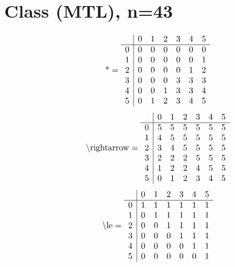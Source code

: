\documentclass[11pt]{article}
\begin{document}
\section{Class (MTL), n=43}
\[\text{*} = 
\begin{array}{r | r r r r r r}
 & 0 & 1 & 2 & 3 & 4 & 5 \\ \hline
0 & 0 & 0 & 0 & 0 & 0 & 0 \\
1 & 0 & 0 & 0 & 0 & 0 & 1 \\
2 & 0 & 0 & 0 & 0 & 1 & 2 \\
3 & 0 & 0 & 0 & 3 & 3 & 3 \\
4 & 0 & 0 & 1 & 3 & 3 & 4 \\
5 & 0 & 1 & 2 & 3 & 4 & 5 \\
\end{array}
\]
\[\text{\textbackslash rightarrow} = 
\begin{array}{r | r r r r r r}
 & 0 & 1 & 2 & 3 & 4 & 5 \\ \hline
0 & 5 & 5 & 5 & 5 & 5 & 5 \\
1 & 4 & 5 & 5 & 5 & 5 & 5 \\
2 & 3 & 4 & 5 & 5 & 5 & 5 \\
3 & 2 & 2 & 2 & 5 & 5 & 5 \\
4 & 1 & 2 & 2 & 4 & 5 & 5 \\
5 & 0 & 1 & 2 & 3 & 4 & 5 \\
\end{array}
\]
\[\text{\textbackslash le} = 
\begin{array}{r | r r r r r r}
 & 0 & 1 & 2 & 3 & 4 & 5 \\ \hline
0 & 1 & 1 & 1 & 1 & 1 & 1 \\
1 & 0 & 1 & 1 & 1 & 1 & 1 \\
2 & 0 & 0 & 1 & 1 & 1 & 1 \\
3 & 0 & 0 & 0 & 1 & 1 & 1 \\
4 & 0 & 0 & 0 & 0 & 1 & 1 \\
5 & 0 & 0 & 0 & 0 & 0 & 1 \\
\end{array}
\]
\end{document}
